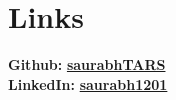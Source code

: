 \documentclass[]{deedy-resume-reversed}
\begin{document}
\begin{minipage}[t]{0.33\textwidth}
\sectionsep







\section{Links}
\textbf{Github:} \href{https://github.com/saurabhTARS}{\bf saurabhTARS} \\
\textbf{LinkedIn:} \href{https://www.linkedin.com/in/saurabh1201/}{\bf saurabh1201}
\sectionsep

\end{minipage}
\end{document}
